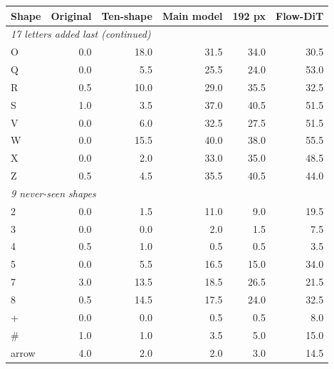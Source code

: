 \begin{tabular}{lrrrrr}
\toprule
Shape & Original & Ten-shape & Main model & 192 px & Flow-DiT \\
\midrule
\multicolumn{6}{l}{\textit{17 letters added last (continued)}} \\
O & 0.0 & 18.0 & 31.5 & 34.0 & 30.5 \\
Q & 0.0 & 5.5 & 25.5 & 24.0 & 53.0 \\
R & 0.5 & 10.0 & 29.0 & 35.5 & 32.5 \\
S & 1.0 & 3.5 & 37.0 & 40.5 & 51.5 \\
V & 0.0 & 6.0 & 32.5 & 27.5 & 51.5 \\
W & 0.0 & 15.5 & 40.0 & 38.0 & 55.5 \\
X & 0.0 & 2.0 & 33.0 & 35.0 & 48.5 \\
Z & 0.5 & 4.5 & 35.5 & 40.5 & 44.0 \\
\midrule
\multicolumn{6}{l}{\textit{9 never-seen shapes}} \\
2 & 0.0 & 1.5 & 11.0 & 9.0 & 19.5 \\
3 & 0.0 & 0.0 & 2.0 & 1.5 & 7.5 \\
4 & 0.5 & 1.0 & 0.5 & 0.5 & 3.5 \\
5 & 0.0 & 5.5 & 16.5 & 15.0 & 34.0 \\
7 & 3.0 & 13.5 & 18.5 & 26.5 & 21.5 \\
8 & 0.5 & 14.5 & 17.5 & 24.0 & 32.5 \\
+ & 0.0 & 0.0 & 0.5 & 0.5 & 8.0 \\
\# & 1.0 & 1.0 & 3.5 & 5.0 & 15.0 \\
arrow & 4.0 & 2.0 & 2.0 & 3.0 & 14.5 \\
\bottomrule
\end{tabular}
